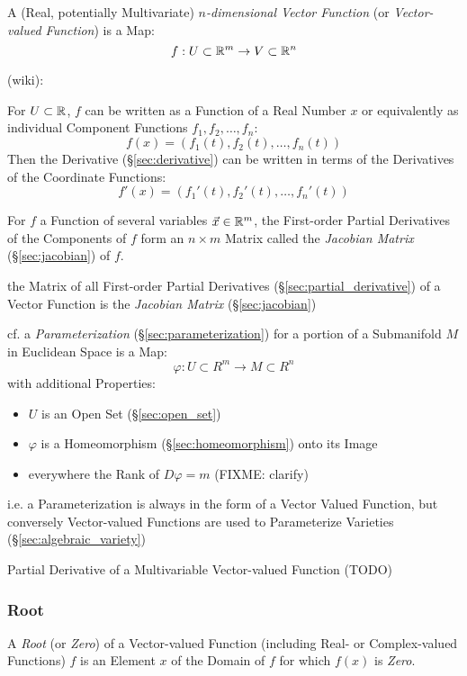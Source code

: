 A (Real, potentially Multivariate) \emph{$n$-dimensional Vector Function} (or
\emph{Vector-valued Function}) is a Map:
\[
  f : U \subset \mathbb{R}^m \rightarrow V \subset \mathbb{R}^n
\]

(wiki):

For $U \subset \mathbb{R}$, $f$ can be written as a Function of a Real Number $x$ or
equivalently as individual Component Functions $f_1, f_2, \ldots, f_n$:
\[
  f(x) = (f_1(t), f_2(t), \ldots, f_n(t))
\]
Then the Derivative (\S\ref{sec:derivative}) can be written in terms of the
Derivatives of the Coordinate Functions:
\[
  f'(x) = (f_1'(t), f_2'(t), \ldots, f_n'(t))
\]

For $f$ a Function of several variables $\vec{x} \in \mathbb{R}^m$, the First-order
Partial Derivatives of the Components of $f$ form an $n \times m$ Matrix called
the \emph{Jacobian Matrix} (\S\ref{sec:jacobian}) of $f$.

the Matrix of all First-order Partial Derivatives
(\S\ref{sec:partial_derivative}) of a Vector Function is the \emph{Jacobian
  Matrix} (\S\ref{sec:jacobian})

\fist cf. a \emph{Parameterization} (\S\ref{sec:parameterization}) for a
portion of a Submanifold $M$ in Euclidean Space is a Map:
\[
  \varphi : U \subset R^m \rightarrow M \subset R^n
\]
with additional Properties:
\begin{itemize}
  \item $U$ is an Open Set (\S\ref{sec:open_set})
  \item $\varphi$ is a Homeomorphism (\S\ref{sec:homeomorphism}) onto its Image
  \item everywhere the Rank of $D\varphi = m$ (FIXME: clarify)
\end{itemize}
i.e. a Parameterization is always in the form of a Vector Valued Function, but
conversely Vector-valued Functions are used to Parameterize Varieties
(\S\ref{sec:algebraic_variety}) %

Partial Derivative of a Multivariable Vector-valued Function (TODO)



\subsubsection{Root}\label{sec:root}

A \emph{Root} (or \emph{Zero}) of a Vector-valued Function (including Real- or
Complex-valued Functions) $f$ is an Element $x$ of the Domain of $f$ for which
$f(x)$ is \emph{Zero}.

